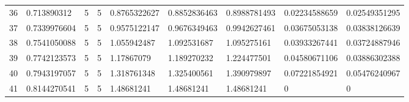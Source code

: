 \begin{tabular}{@{}lllllllll@{}}
36 & 0.713890312 & 5 & 5 & 0.8765322627 & 0.8852836463 & 0.8988781493 & 0.02234588659 & 0.02549351295 \\
37 & 0.7339976604 & 5 & 5 & 0.9575122147 & 0.9676349463 & 0.9942627461 & 0.03675053138 & 0.03838126639 \\
38 & 0.7541050088 & 5 & 5 & 1.055942487 & 1.092531687 & 1.095275161 & 0.03933267441 & 0.03724887946 \\
39 & 0.7742123573 & 5 & 5 & 1.17867079 & 1.189270232 & 1.224477501 & 0.04580671106 & 0.03886302388 \\
40 & 0.7943197057 & 5 & 5 & 1.318761348 & 1.325400561 & 1.390979897 & 0.07221854921 & 0.05476240967 \\
41 & 0.8144270541 & 5 & 5 & 1.48681241 & 1.48681241 & 1.48681241 & 0 & 0 \\
\bottomrule
\end{tabular}
